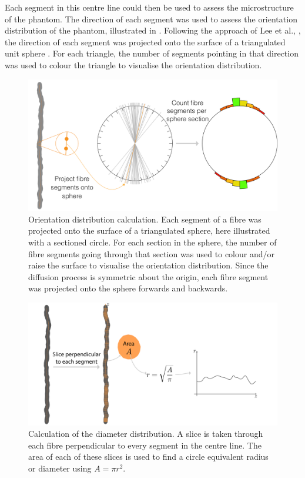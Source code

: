 Each segment in this centre line could then be used to assess the microstructure of the phantom. The direction of each segment was used to assess the orientation distribution of the phantom, illustrated in . Following the approach of Lee et al., \cite{Lee2019b}, the direction of each segment was projected onto the surface of a triangulated unit sphere \cite{Womersley2018}. For each triangle, the number of segments pointing in that direction was used to colour the triangle to visualise the orientation distribution.

\begin{figure}
  \centering
  \includegraphics[width=\textwidth]{figures/config/od_calculation-01_sym_whitebg.png}
  \caption[Orientation distribution extraction from microstructure]{Orientation distribution calculation. Each segment of a fibre was projected onto the surface of a triangulated sphere, here illustrated with a sectioned circle. For each section in the sphere, the number of fibre segments going through that section was used to colour and/or raise the surface to visualise the orientation distribution. Since the diffusion process is symmetric about the origin, each fibre segment was projected onto the sphere forwards and backwards.}
  \label{fig:config_micro_OD}
\end{figure}

\begin{figure}
  \centering
  \includegraphics[width=\textwidth]{figures/config/diam_calculation-01.png}
  \caption[Diameter distribution extraction from microstructure]{Calculation of the diameter distribution. A slice is taken through each fibre perpendicular to every segment in the centre line. The area of each of these slices is used to find a circle equivalent radius or diameter using $A = \pi r^2$. }
  \label{fig:config_micro_diam}
\end{figure}

